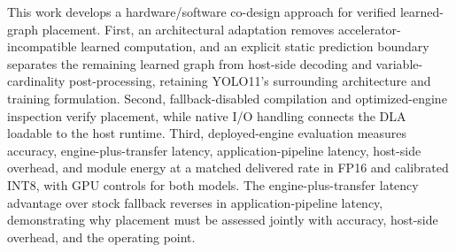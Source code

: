 This work develops a hardware/software co-design approach for verified
learned-graph placement. First, an architectural adaptation removes accelerator-incompatible
learned computation, and an explicit static prediction boundary separates the
remaining learned graph from host-side decoding and variable-cardinality
post-processing, retaining YOLO11's surrounding architecture and training
formulation. Second, fallback-disabled compilation
and optimized-engine inspection verify placement, while native I/O handling
connects the DLA loadable to the host runtime. Third, deployed-engine evaluation
measures accuracy, engine-plus-transfer latency, application-pipeline latency,
host-side overhead, and module energy at a matched delivered rate in FP16
and calibrated INT8, with GPU controls for both models.
The engine-plus-transfer latency advantage over stock fallback reverses in
application-pipeline latency, demonstrating why placement must be assessed
jointly with accuracy, host-side overhead, and the operating point.
